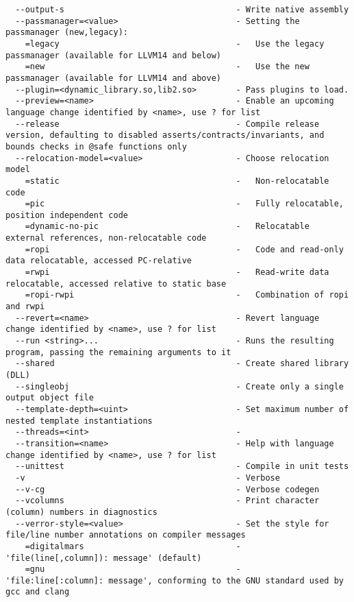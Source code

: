 \documentclass{studrep}
\begin{document}
\begin{verbatim}
  --output-s                                   - Write native assembly
  --passmanager=<value>                        - Setting the passmanager (new,legacy):
    =legacy                                    -   Use the legacy passmanager (available for LLVM14 and below)
    =new                                       -   Use the new passmanager (available for LLVM14 and above)
  --plugin=<dynamic_library.so,lib2.so>        - Pass plugins to load.
  --preview=<name>                             - Enable an upcoming language change identified by <name>, use ? for list
  --release                                    - Compile release version, defaulting to disabled asserts/contracts/invariants, and bounds checks in @safe functions only
  --relocation-model=<value>                   - Choose relocation model
    =static                                    -   Non-relocatable code
    =pic                                       -   Fully relocatable, position independent code
    =dynamic-no-pic                            -   Relocatable external references, non-relocatable code
    =ropi                                      -   Code and read-only data relocatable, accessed PC-relative
    =rwpi                                      -   Read-write data relocatable, accessed relative to static base
    =ropi-rwpi                                 -   Combination of ropi and rwpi
  --revert=<name>                              - Revert language change identified by <name>, use ? for list
  --run <string>...                            - Runs the resulting program, passing the remaining arguments to it
  --shared                                     - Create shared library (DLL)
  --singleobj                                  - Create only a single output object file
  --template-depth=<uint>                      - Set maximum number of nested template instantiations
  --threads=<int>                              -
  --transition=<name>                          - Help with language change identified by <name>, use ? for list
  --unittest                                   - Compile in unit tests
  -v                                           - Verbose
  --v-cg                                       - Verbose codegen
  --vcolumns                                   - Print character (column) numbers in diagnostics
  --verror-style=<value>                       - Set the style for file/line number annotations on compiler messages
    =digitalmars                               -   'file(line[,column]): message' (default)
    =gnu                                       -   'file:line[:column]: message', conforming to the GNU standard used by gcc and clang

\end{verbatim}
\end{document}

